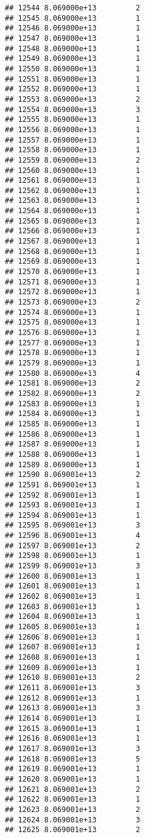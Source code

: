 \documentclass[
]{article}
\begin{document}
\begin{verbatim}
## 12544 8.069000e+13         2
## 12545 8.069000e+13         1
## 12546 8.069000e+13         1
## 12547 8.069000e+13         1
## 12548 8.069000e+13         1
## 12549 8.069000e+13         1
## 12550 8.069000e+13         1
## 12551 8.069000e+13         1
## 12552 8.069000e+13         1
## 12553 8.069000e+13         2
## 12554 8.069000e+13         3
## 12555 8.069000e+13         1
## 12556 8.069000e+13         1
## 12557 8.069000e+13         1
## 12558 8.069000e+13         1
## 12559 8.069000e+13         2
## 12560 8.069000e+13         1
## 12561 8.069000e+13         1
## 12562 8.069000e+13         1
## 12563 8.069000e+13         1
## 12564 8.069000e+13         1
## 12565 8.069000e+13         1
## 12566 8.069000e+13         1
## 12567 8.069000e+13         1
## 12568 8.069000e+13         1
## 12569 8.069000e+13         1
## 12570 8.069000e+13         1
## 12571 8.069000e+13         1
## 12572 8.069000e+13         1
## 12573 8.069000e+13         2
## 12574 8.069000e+13         1
## 12575 8.069000e+13         1
## 12576 8.069000e+13         1
## 12577 8.069000e+13         1
## 12578 8.069000e+13         1
## 12579 8.069000e+13         1
## 12580 8.069000e+13         4
## 12581 8.069000e+13         2
## 12582 8.069000e+13         2
## 12583 8.069000e+13         1
## 12584 8.069000e+13         1
## 12585 8.069000e+13         1
## 12586 8.069000e+13         1
## 12587 8.069000e+13         1
## 12588 8.069000e+13         1
## 12589 8.069000e+13         1
## 12590 8.069001e+13         2
## 12591 8.069001e+13         1
## 12592 8.069001e+13         1
## 12593 8.069001e+13         1
## 12594 8.069001e+13         1
## 12595 8.069001e+13         3
## 12596 8.069001e+13         4
## 12597 8.069001e+13         2
## 12598 8.069001e+13         1
## 12599 8.069001e+13         3
## 12600 8.069001e+13         1
## 12601 8.069001e+13         1
## 12602 8.069001e+13         1
## 12603 8.069001e+13         1
## 12604 8.069001e+13         1
## 12605 8.069001e+13         1
## 12606 8.069001e+13         1
## 12607 8.069001e+13         1
## 12608 8.069001e+13         1
## 12609 8.069001e+13         1
## 12610 8.069001e+13         2
## 12611 8.069001e+13         3
## 12612 8.069001e+13         1
## 12613 8.069001e+13         3
## 12614 8.069001e+13         1
## 12615 8.069001e+13         1
## 12616 8.069001e+13         1
## 12617 8.069001e+13         3
## 12618 8.069001e+13         5
## 12619 8.069001e+13         1
## 12620 8.069001e+13         1
## 12621 8.069001e+13         2
## 12622 8.069001e+13         1
## 12623 8.069001e+13         2
## 12624 8.069001e+13         3
## 12625 8.069001e+13         2

\end{verbatim}
\end{document}
